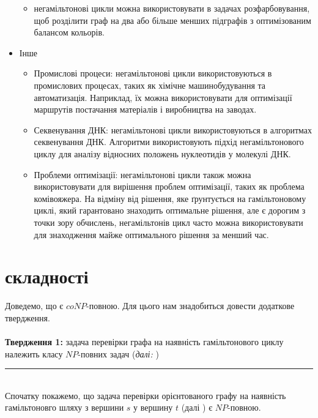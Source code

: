 \documentclass[14pt]{article}
\begin{document}
\begin{spacing}{1.175}
\begin{itemize}
\begin{itemize}
             \item негамільтонові цикли можна використовувати в задачах розфарбовування, щоб розділити граф на два або більше менших підграфів з оптимізованим балансом кольорів.
        
        \end{itemize}


        \item Інше
        \begin{itemize}
            
            \item Промислові процеси: негамільтонові цикли використовуються в промислових процесах, таких як хімічне машинобудування та автоматизація. Наприклад, їх можна використовувати для оптимізації маршрутів постачання матеріалів і виробництва на заводах.

            \item Секвенування ДНК: негамільтонові цикли використовуються в алгоритмах секвенування ДНК. Алгоритми використовують підхід негамільтонового циклу для аналізу відносних положень нуклеотидів у молекулі ДНК.

            \item Проблеми оптимізації: негамільтонові цикли також можна використовувати для вирішення проблем оптимізації, таких як проблема комівояжера. На відміну від рішення, яке ґрунтується на гамільтоновому циклі, який гарантовано знаходить оптимальне рішення, але є дорогим з точки зору обчислень, негамільтонів цикл часто можна використовувати для знаходження майже оптимального рішення за менший час.
        
        \end{itemize}
    \end{itemize}
    

    
    
    \section{ складності}
    \quad Доведемо, що \nonhamcycle є \(coNP\)-повною. Для цього нам знадобиться довести додаткове твердження. \\\\
    \textbf{Твердження 1:} задача перевірки графа на наявність гамільтонового циклу належить класу \(NP\)-повних задач (\textit{далі:} \hamcycle)\\
    \rule{0.7em}{0.7em}\\
    Спочатку покажемо, що задача перевірки орієнтованого графу на наявність гамільтоновго шляху з вершини \(s\) у вершину \(t\) (далі \dhampath)  є \(NP\)-повною.
    \\ 
    

\end{spacing}
\end{document}
